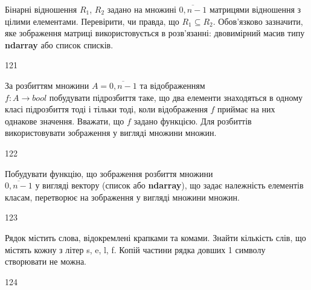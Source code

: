 Бінарні відношення $R_1$, $R_2$ задано на множині $\overline{0,n-1}$ матрицями відношення з цілими елементами. Перевірити, чи правда, що  $R_1\subseteq R_2$. Обов'язково зазначити, яке зображення матриці використовується в розв'язанні: двовимірний масив типу \textbf{ndarray} або список списків.
\\\par
121 














За розбиттям множини $A=\overline{0,n-1}$ та відображенням\\ $f{:}A\rightarrow{bool}$  побудувати підрозбиття таке, що два елементи знаходяться в одному класі підрозбиття тоді і тільки тоді, коли відображення $f$ приймає на них однакове значення. Вважати, що $f$ задано функцією. Для розбиттів використовувати зображення у вигляді множини множин.
\\\par
122 














Побудувати функцію, що зображення розбиття множини\\ $\overline{0,n-1}$  у вигляді вектору (список або  \textbf{ndarray}), що задає належність елементів класам, перетворює на зображення у вигляді множини множин.
\\\par
123 














Рядок містить слова, відокремлені крапками та комами. Знайти кількість слів, що містять кожну з літер s, e, l, f. Копій частини рядка довших 1 символу створювати не можна.
\\\par
124 














